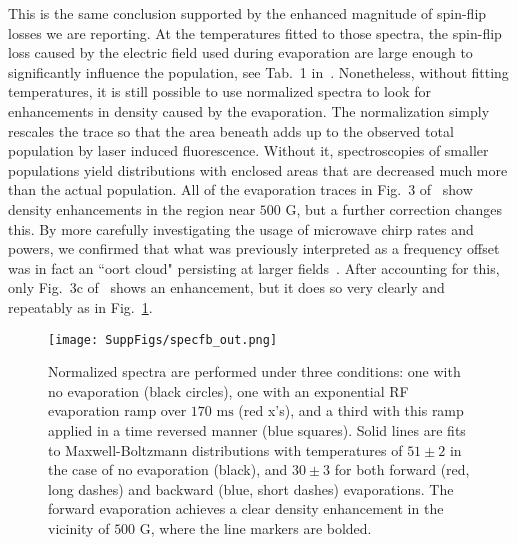 \documentclass[%
 reprint,
 amsmath,amssymb,
 aps,
pra,
]{revtex4-1}
\begin{document}
This is the same conclusion supported by the enhanced magnitude of spin-flip losses we are reporting.
At the temperatures fitted to those spectra, the spin-flip loss caused by the electric field used during evaporation are large enough to significantly influence the population, see Tab.~1 in~\cite{smt}.
Nonetheless, without fitting temperatures, it is still possible to use normalized spectra to look for enhancements in density caused by the evaporation.
The normalization simply rescales the trace so that the area beneath adds up to the observed total population by laser induced fluorescence. 
Without it, spectroscopies of smaller populations yield distributions with enclosed areas that are decreased much more than the actual population.
All of the evaporation traces in Fig.~3 of~\cite{Stuhl2012evap} show density enhancements in the region near $500\text{ G}$, but a further correction changes this.
By more carefully investigating the usage of microwave chirp rates and powers, we confirmed that what was previously interpreted as a frequency offset was in fact an ``oort cloud" persisting at larger fields~\cite{Inguscio1999}.
After accounting for this, only Fig.~3c of~\cite{Stuhl2012evap} shows an enhancement, but it does so very clearly and repeatably as in Fig.~\ref{fig:normenhance}.

\begin{figure}[tb]
\texttt{[image: SuppFigs/specfb\_out.png]}%
\caption{
Normalized spectra are performed under three conditions: one with no evaporation (black circles), one with an exponential RF evaporation ramp over $170\text{ ms}$ (red x's), and a third with this ramp applied in a time reversed manner (blue squares). Solid lines are fits to Maxwell-Boltzmann distributions with temperatures of $51\pm2$ in the case of no evaporation (black), and $30\pm3$ for both forward (red, long dashes) and backward (blue, short dashes) evaporations. The forward evaporation achieves a clear density enhancement in the vicinity of $500\text{ G}$, where the line markers are bolded. 
}
\label{fig:normenhance}
\end{figure}
\end{document}
